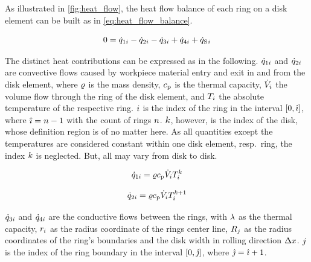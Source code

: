 \documentclass{PyRollDocs}
\begin{document}
    As illustrated in \autoref{fig:heat_flow}, the heat flow balance of each ring on a disk element can be built as in \autoref{eq:heat_flow_balance}.

    \begin{equation}
        0 = {\dot{q}}_{1{i}} - {\dot{q}}_{2{i}} - {\dot{q}}_{3{i}} + {\dot{q}}_{4{i}} + {\dot{q}_\mathrm{S}}{}_{{i}}
        \label{eq:heat_flow_balance}
    \end{equation}

    The distinct heat contributions can be expressed as in the following.
    ${\dot{q}}_{1{i}}$ and ${\dot{q}}_{2{i}}$ are convective flows caused by workpiece material entry and exit in and from the disk element, where ${\varrho}$ is the mass density, ${c_\mathrm{p}}$ is the thermal capacity, ${\dot{V}}_{i}$ the volume flow through the ring of the disk element, and ${T}_{i}$ the absolute temperature of the respective ring.
    ${i}$ is the index of the ring in the interval $[0, {\hat{\imath}}]$, where ${\hat{\imath}} = {n} - 1$ with the count of rings ${n}$.
    ${k}$, however, is the index of the disk, whose definition region is of no matter here.
    As all quantities except the temperatures are considered constant within one disk element, resp.\ ring, the index ${k}$ is neglected.
    But, all may vary from disk to disk.

    \begin{equation}
        {\dot{q}}_{1{i}} = {\varrho} {c_\mathrm{p}} {\dot{V}}_{i} {T}_{{i}}^{{k}}
        \label{eq:heat_flow_1}
    \end{equation}

    \begin{equation}
        {\dot{q}}_{2{i}} = {\varrho} {c_\mathrm{p}} {\dot{V}}_{i} {T}_{{i}}^{{k}+1}
        \label{eq:heat_flow_2}
    \end{equation}

    ${\dot{q}}_{3{i}}$ and ${\dot{q}}_{4{i}}$ are the conductive flows between the rings, with ${\lambda}$ as the thermal capacity, ${r}_{i}$ as the radius coordinate of the rings center line, ${R}_{j}$ as the radius coordinates of the ring's boundaries and the disk width in rolling direction ${\Delta x}$.
    ${j}$ is the index of the ring boundary in the interval $[0, {\hat{\jmath}}]$, where ${\hat{\jmath}} = {\hat{\imath}} + 1$.
\end{document}
